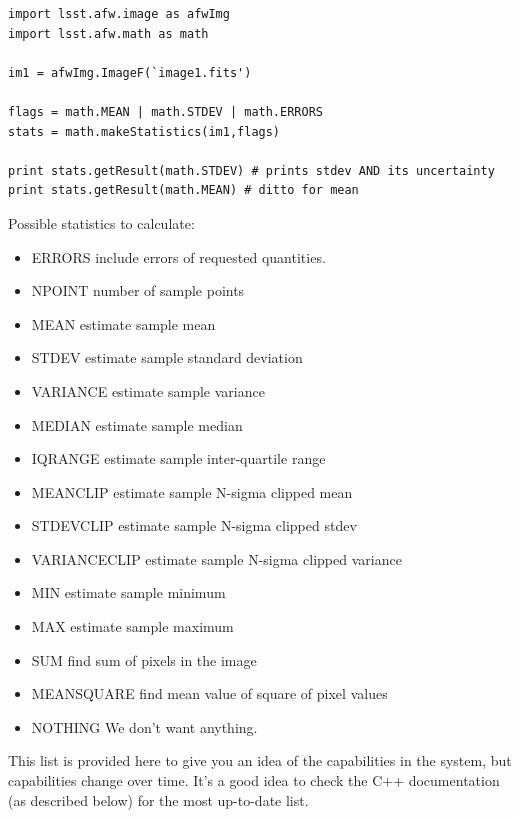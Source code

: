 \begin{verbatim}
import lsst.afw.image as afwImg
import lsst.afw.math as math

im1 = afwImg.ImageF(`image1.fits')

flags = math.MEAN | math.STDEV | math.ERRORS 
stats = math.makeStatistics(im1,flags)

print stats.getResult(math.STDEV) # prints stdev AND its uncertainty
print stats.getResult(math.MEAN) # ditto for mean

\end{verbatim}

Possible statistics to calculate:
\begin{itemize}
\item ERRORS     include errors of requested quantities.
\item NPOINT     number of sample points
\item MEAN     estimate sample mean
\item STDEV     estimate sample standard deviation
\item VARIANCE     estimate sample variance
\item MEDIAN     estimate sample median
\item IQRANGE     estimate sample inter-quartile range
\item MEANCLIP     estimate sample N-sigma clipped mean
\item STDEVCLIP     estimate sample N-sigma clipped stdev
\item VARIANCECLIP     estimate sample N-sigma clipped variance
\item MIN     estimate sample minimum
\item MAX     estimate sample maximum
\item SUM     find sum of pixels in the image
\item MEANSQUARE     find mean value of square of pixel values
\item NOTHING     We don't want anything.
\end{itemize}

This list is provided here to give you an idea of the capabilities in
the system, but capabilities change over time.  It's a good idea to
check the C++ documentation (as described below) for the most
up-to-date list.  

